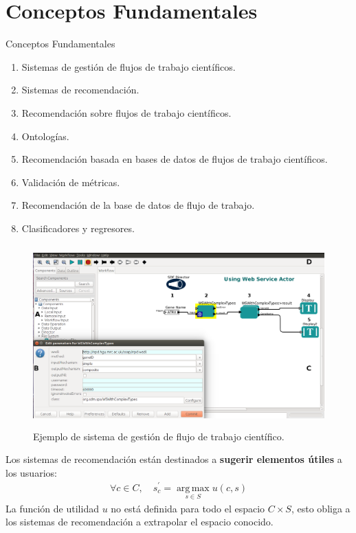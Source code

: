 \section{Conceptos Fundamentales}

\begin{frame}
	\begin{block}{Conceptos Fundamentales}
		 \begin{enumerate}
		  \item Sistemas de gestión de flujos de trabajo científicos.
		  \item Sistemas de recomendación.
		  \item Recomendación sobre flujos de trabajo científicos.
		  \item Ontologías.
		  \item Recomendación basada en bases de datos de flujos de trabajo científicos.
		  \item Validación de métricas.
		  \item Recomendación de la base de datos de flujo de trabajo.
		  \item Clasificadores y regresores.
		 \end{enumerate}
	\end{block}
\end{frame}


\begin{frame}
	\begin{figure}[!htb]
		\centering	  				
		\includegraphics[height=7cm]{./secoes/ConceitosFundamentais/webService.png}
		\caption{Ejemplo de sistema de gestión de flujo de trabajo científico.}
		\label{fig_sistema_gerenciador_workflow_cientifico}
 	\end{figure}
\end{frame}


\begin{frame}		
	\begin{block}{}
		Los sistemas de recomendación están destinados a \textbf{sugerir elementos útiles} a los usuarios:
		\begin{eqnarray}
		\forall c \in C,  \quad s_{c}^{'} =  \operatorname*{arg\,max}_{s \in S} u(c,s) \label{formalizar_recomendacao}
		\end{eqnarray}
		La función de utilidad \(u\) no está definida para todo el espacio \(C \times S\), esto obliga a los sistemas de recomendación a extrapolar el espacio conocido.
	\end{block}
\end{frame}


